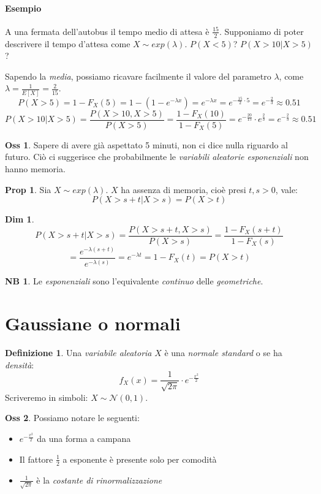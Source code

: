 \documentclass[12pt, a4paper]{report}
\theoremstyle{definition}
\newtheorem{definition}{Definizione}[section]
\newtheorem*{demonstration}{Dim}
\newtheorem*{proposition}{Prop}
\newtheorem*{observation}{Oss}
\newtheorem*{note}{NB}
\DeclareRobustCommand{\norm}{\mathcal{N}}
\begin{document}
\paragraph*{Esempio}
A una fermata dell'autobus il tempo medio di attesa è $\frac{15}{2}$. Supponiamo
di poter descrivere il tempo d'attesa come \(X\sim exp(\lambda)\). \(P(X<5)\)?
\(P(X>10|X>5)\)?

Sapendo la \emph{media}, possiamo ricavare facilmente il valore del parametro
$\lambda$, come \(\lambda=\frac{1}{E[X]}=\frac{2}{15}\).
\[P(X>5)=1-F_X(5)=1-(1-e^{-\lambda x})=e^{-\lambda x}=e^{-\frac{15}{2}\cdot 5}=e^{-
\frac{2}{3}}\approx 0.51\]
\[P(X>10|X>5)=\frac{P(X>10,X>5)}{P(X>5)}=\frac{1-F_X(10)}{1-F_X(5)}=e^{-\frac{20}{15}}
\cdot e^{\frac{2}{3}}=e^{-\frac{2}{3}}\approx 0.51\]

\begin{observation}
	Sapere di avere già aspettato 5 minuti, non ci dice nulla riguardo al futuro.
	Ciò ci suggerisce che probabilmente le \emph{variabili aleatorie esponenziali}
	non hanno memoria.
\end{observation}
\begin{proposition}
	Sia \(X\sim exp(\lambda)\). $X$ ha assenza di memoria, cioè presi \(t,s>0\),
	vale:
	\[P(X>s+t|X>s)=P(X>t)\]
\end{proposition}
\begin{demonstration}
	\[P(X>s+t|X>s)=\frac{P(X>s+t,X>s)}{P(X>s)}=\frac{1-F_X(s+t)}{1-F_X(s)}\]
	\[=\frac{e^{-\lambda(s+t)}}{e^{-\lambda(s)}}=e^{-\lambda t}=1-F_X(t)=P(X>t)\]	
\end{demonstration}

\begin{note}
	Le \emph{esponenziali} sono l'equivalente \emph{continuo} delle \emph{geometriche}.
\end{note}

\section{Gaussiane o normali}
\begin{definition}
	Una \emph{variabile aleatoria} $X$ è una \emph{normale standard} o se ha
	\emph{densità}:
	\[f_X(x)=\frac{1}{\sqrt{2\pi}}\cdot e^{-\frac{x^2}{2}}\]
	Scriveremo in simboli: \(X\sim\norm(0,1)\).
\end{definition}
\begin{observation}
	Possiamo notare le seguenti:
	\begin{itemize}
		\item \(e^{-\frac{x^2}{2}}\) da una forma a campana
		\item Il fattore $\frac{1}{2}$ a esponente è presente solo per comodità
		\item $\frac{1}{\sqrt{2\pi}}$ è la \emph{costante di rinormalizzazione}
	\end{itemize}
\end{observation}
\end{document}

